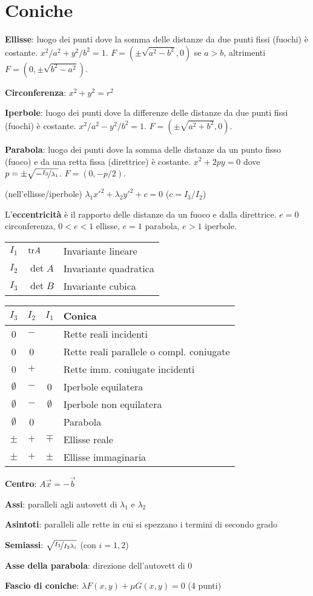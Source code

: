 \section{Coniche}

\textbf{Ellisse}: luogo dei punti dove la somma delle distanze da due punti fissi (fuochi) è costante. $x^2/a^2 + y^2/b^2 = 1$.
$F=(\pm\sqrt{a^2-b^2}, 0)$ se $a>b$, altrimenti $F=(0, \pm\sqrt{b^2-a^2})$.

\textbf{Circonferenza}: $x^2+y^2=r^2$

\textbf{Iperbole}: luogo dei punti dove la differenze delle distanze da due punti fissi (fuochi) è costante. $x^2/a^2 - y^2/b^2 = 1$.
$F=(\pm\sqrt{a^2+b^2}, 0)$.

\textbf{Parabola}: luogo dei punti dove la somma delle distanze da un punto fisso (fuoco) e da una retta fissa (direttrice) è costante. $x^2+2py=0$ dove $p=\pm \sqrt{-\nicefrac{I_3}{\lambda_1}}$.
$F=(0, -p/2)$.

(nell'ellisse/iperbole) $\lambda_1x'^2+\lambda_2y'^2+c=0$ ($c=I_3/I_2$)

L'\textbf{eccentricità} è il rapporto delle distanze da un fuoco e dalla direttrice. $e = 0$ circonferenza, $0 < e < 1$ ellisse, $e = 1$ parabola, $e > 1$ iperbole. 

\begin{tabular}{lll}
	$I_1$ & $\mathrm{tr} A$ & Invariante lineare \\
	$I_2$ & $\det A$ & Invariante quadratica \\
	$I_3$ & $\det B$ & Invariante cubica
\end{tabular}

\begin{tabular}{c|c|c|l}
	\boldmath$I_3$ & \boldmath$I_2$ & \boldmath$I_1$ & \textbf{Conica} \\
	\hline
	0           & $-$   &       & Rette reali incidenti \\
	0           & 0     &       & Rette reali parallele o compl. coniugate \\
	0           & $+$   &       & Rette imm. coniugate incidenti \\
	\hline
	$\emptyset$ & $-$   & 0     & Iperbole equilatera \\
	$\emptyset$ & $-$   & $\emptyset$ & Iperbole non equilatera \\
	$\emptyset$ & 0     &       & Parabola \\
	$\pm$       & $+$   & $\mp$ & Ellisse reale \\
	$\pm$       & $+$   & $\pm$ & Ellisse immaginaria \\
	\hline
\end{tabular}

\textbf{Centro}: $A\vec{x} = -\vec{b}$

\textbf{Assi}: paralleli agli autovett di $\lambda_1$ e $\lambda_2$

\textbf{Asintoti}: paralleli alle rette in cui si spezzano i termini di secondo grado

\textbf{Semiassi}: $\sqrt{\nicefrac{I_3}{I_2\lambda_i}}$ (con $i=1,2$)

\textbf{Asse della parabola}: direzione dell'autovett di 0

\textbf{Fascio di coniche}: $\lambda F(x,y) + \mu G(x,y) = 0$ (4 punti)

